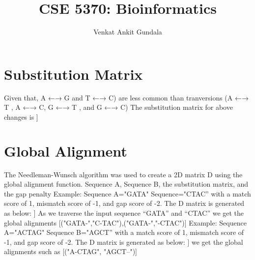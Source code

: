 \documentclass{article}
\title{CSE 5370: Bioinformatics}
\author{Venkat Ankit Gundala}
\begin{document}
\section{Substitution Matrix}
Given that, A ←→ G and T ←→ C) are less common
than tranversions (A ←→ T , A ←→ C, G ←→ T , and G ←→ C)
\newline The substitution matrix for above changes is
\newline[[0 A G T C]
\newline[A 1  -2 -1 -1]
\newline[G -2 1 -1 -1]
\newline[T -1 -1 1 -2]
\newline[C -1 -1 -2 1]]

 


\section{Global Alignment}
The Needleman-Wunsch algorithm was used to create a 2D matrix D using the global alignment function. Sequence A, Sequence B, the substitution matrix, and the gap penalty \newline Example: Sequence A="GATA"
Sequence="CTAC” with a match score of 1, mismatch score of -1, and gap score of -2.
\newline The D matrix is generated as below:
\newline[[ 0 -2 -4 -6 -8]
 \newline[-2 -1 -3 -5 -5]
 \newline[-4 -3 -2 -2 -4]
 \newline[-6 -5 -2 -3 -3]
 \newline[-8 -7 -4 -1 -3]]
 \newline As we traverse the input sequence “GATA”
and “CTAC” we get the global alignments [("GATA-","C-TAC"),("GATA-","-CTAC")]
\newline
\newline Example: Sequence A="ACTAG" Sequence B="AGCT” with a match score
of 1, mismatch score of -1, and gap score of -2.
\newline The D matrix is generated as below:
\newline[[  0  -2  -4  -6  -8]
\newline[ -2   1  -1  -3  -5]
\newline[ -4  -1   0   0  -2]
\newline[ -6  -3  -2   -1  1]
\newline[ -8  -5  -4   -3  -1]
\newline[ -10  -7  -4  -5   -3]]
\newline we get the global alignments such as [("A-CTAG", "AGCT--")]
\end{document}
